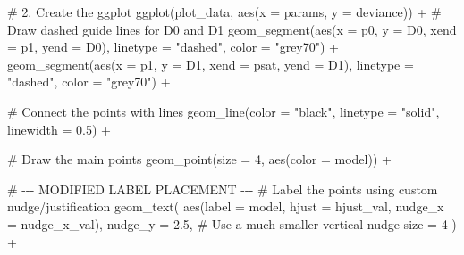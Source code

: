 \documentclass[
  letterpaper,
]{scrbook}
\newenvironment{Shaded}{\begin{snugshade}}{\end{snugshade}}
\newcommand{\AttributeTok}[1]{\textcolor[rgb]{0.40,0.45,0.13}{#1}}
\newcommand{\CommentTok}[1]{\textcolor[rgb]{0.37,0.37,0.37}{#1}}
\newcommand{\DecValTok}[1]{\textcolor[rgb]{0.68,0.00,0.00}{#1}}
\newcommand{\FloatTok}[1]{\textcolor[rgb]{0.68,0.00,0.00}{#1}}
\newcommand{\FunctionTok}[1]{\textcolor[rgb]{0.28,0.35,0.67}{#1}}
\newcommand{\NormalTok}[1]{\textcolor[rgb]{0.00,0.23,0.31}{#1}}
\newcommand{\SpecialCharTok}[1]{\textcolor[rgb]{0.37,0.37,0.37}{#1}}
\newcommand{\StringTok}[1]{\textcolor[rgb]{0.13,0.47,0.30}{#1}}
\begin{document}
\begin{Shaded}
\begin{Highlighting}[]
\CommentTok{\# 2. Create the ggplot}
\FunctionTok{ggplot}\NormalTok{(plot\_data, }\FunctionTok{aes}\NormalTok{(}\AttributeTok{x =}\NormalTok{ params, }\AttributeTok{y =}\NormalTok{ deviance)) }\SpecialCharTok{+}
  \CommentTok{\# Draw dashed guide lines for D0 and D1}
  \FunctionTok{geom\_segment}\NormalTok{(}\FunctionTok{aes}\NormalTok{(}\AttributeTok{x =}\NormalTok{ p0, }\AttributeTok{y =}\NormalTok{ D0, }\AttributeTok{xend =}\NormalTok{ p1, }\AttributeTok{yend =}\NormalTok{ D0), }\AttributeTok{linetype =} \StringTok{"dashed"}\NormalTok{, }\AttributeTok{color =} \StringTok{"grey70"}\NormalTok{) }\SpecialCharTok{+}
  \FunctionTok{geom\_segment}\NormalTok{(}\FunctionTok{aes}\NormalTok{(}\AttributeTok{x =}\NormalTok{ p1, }\AttributeTok{y =}\NormalTok{ D1, }\AttributeTok{xend =}\NormalTok{ psat, }\AttributeTok{yend =}\NormalTok{ D1), }\AttributeTok{linetype =} \StringTok{"dashed"}\NormalTok{, }\AttributeTok{color =} \StringTok{"grey70"}\NormalTok{) }\SpecialCharTok{+}
  
  \CommentTok{\# Connect the points with lines}
  \FunctionTok{geom\_line}\NormalTok{(}\AttributeTok{color =} \StringTok{"black"}\NormalTok{, }\AttributeTok{linetype =} \StringTok{"solid"}\NormalTok{, }\AttributeTok{linewidth =} \FloatTok{0.5}\NormalTok{) }\SpecialCharTok{+}
  
  \CommentTok{\# Draw the main points}
  \FunctionTok{geom\_point}\NormalTok{(}\AttributeTok{size =} \DecValTok{4}\NormalTok{, }\FunctionTok{aes}\NormalTok{(}\AttributeTok{color =}\NormalTok{ model)) }\SpecialCharTok{+}
  
  \CommentTok{\# {-}{-}{-} MODIFIED LABEL PLACEMENT {-}{-}{-}}
  \CommentTok{\# Label the points using custom nudge/justification}
  \FunctionTok{geom\_text}\NormalTok{(}
    \FunctionTok{aes}\NormalTok{(}\AttributeTok{label =}\NormalTok{ model, }\AttributeTok{hjust =}\NormalTok{ hjust\_val, }\AttributeTok{nudge\_x =}\NormalTok{ nudge\_x\_val), }
    \AttributeTok{nudge\_y =} \FloatTok{2.5}\NormalTok{,  }\CommentTok{\# Use a much smaller vertical nudge}
    \AttributeTok{size =} \DecValTok{4}
\NormalTok{  ) }\SpecialCharTok{+}
  

\end{Highlighting}
\end{Shaded}
\end{document}
